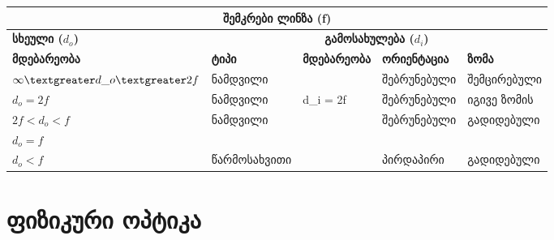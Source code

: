 \documentclass[a4paper]{book}
\begin{document}
\begin{table}[]
\begin{tabular}{|lllll|}
\hline
\multicolumn{5}{|c|}{\textbf{შემკრები ლინზა (f)}}                                                                                                                                                                        \\ \hline
\multicolumn{1}{|l|}{\textbf{სხეული ($d_o$)}}                                 & \multicolumn{4}{c|}{\textbf{გამოსახულება ($d_i$)}}                                                                                       \\ \hline
\multicolumn{1}{|l|}{\textbf{მდებარეობა}}                                     & \multicolumn{1}{l|}{\textbf{ტიპი}} & \multicolumn{1}{l|}{\textbf{მდებარეობა}} & \multicolumn{1}{l|}{\textbf{ორიენტაცია}} & \textbf{ზომა} \\ \hline
\multicolumn{1}{|l|}{$\infty \textgreater d\_o \textgreater 2f$} & \multicolumn{1}{l|}{ნამდვილი}      & \multicolumn{1}{l|}{}                    & \multicolumn{1}{l|}{შებრუნებული}         & შემცირებული   \\ \hline
\multicolumn{1}{|l|}{$d_o = 2f$}                                               & \multicolumn{1}{l|}{ნამდვილი}      & \multicolumn{1}{l|}{d\_i = 2f}           & \multicolumn{1}{l|}{შებრუნებული}         & იგივე ზომის   \\ \hline
\multicolumn{1}{|l|}{$2f < d_o < f$}                           & \multicolumn{1}{l|}{ნამდვილი}      & \multicolumn{1}{l|}{}                    & \multicolumn{1}{l|}{შებრუნებული}         & გადიდებული    \\ \hline
\multicolumn{1}{|l|}{$d_o = f$}                                                & \multicolumn{1}{l|}{}              & \multicolumn{1}{l|}{}                    & \multicolumn{1}{l|}{}                    &               \\ \hline
\multicolumn{1}{|l|}{$d_o < f$}                                        & \multicolumn{1}{l|}{წარმოსახვითი}  & \multicolumn{1}{l|}{}                    & \multicolumn{1}{l|}{პირდაპირი}           & გადიდებული    \\ \hline
\end{tabular}
\end{table}

\chapter{ფიზიკური ოპტიკა}
\end{document}
